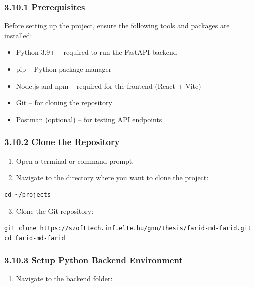 \documentclass[12pt,a4paper,oneside]{report}
\begin{document}
\subsubsection*{3.10.1 Prerequisites}

Before setting up the project, ensure the following tools and packages are installed:
\begin{itemize}[leftmargin=2em]
    \item Python 3.9+ -- required to run the FastAPI backend
    \item pip -- Python package manager
    \item Node.js and npm -- required for the frontend (React + Vite)
    \item Git -- for cloning the repository
    \item Postman (optional) -- for testing API endpoints
\end{itemize}

\subsubsection*{3.10.2 Clone the Repository}

\begin{enumerate}[leftmargin=2em]
    \item Open a terminal or command prompt.
    \item Navigate to the directory where you want to clone the project:
\end{enumerate}

\begin{verbatim}
cd ~/projects
\end{verbatim}

\begin{enumerate}[leftmargin=2em]
    \setcounter{enumi}{2}
    \item Clone the Git repository:
\end{enumerate}

\begin{verbatim}
git clone https://szofttech.inf.elte.hu/gnn/thesis/farid-md-farid.git
cd farid-md-farid
\end{verbatim}

\subsubsection*{3.10.3 Setup Python Backend Environment}

\begin{enumerate}[leftmargin=2em]
    \item Navigate to the backend folder:
\end{enumerate}
\end{document}
